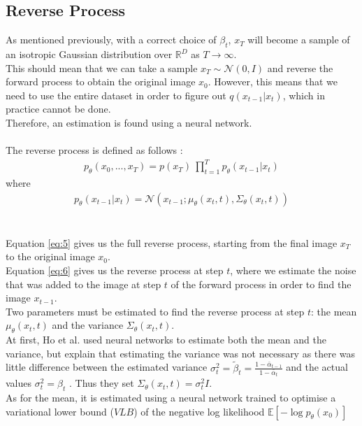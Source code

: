 \documentclass{article}
\begin{document}
\subsection{Reverse Process}

As mentioned previously, with a correct choice of $\beta_t$, $x_T$ will become a sample of an isotropic Gaussian distribution over $\mathbb{R}^D$ as $T \rightarrow \infty$. \cite{nichol2021improved, sohldickstein2015deep} \\
This should mean that we can take a sample $x_T \sim \mathcal{N}\left(0, I\right)$ and reverse the forward process to obtain the original image $x_0$. 
However, this means that we need to use the entire dataset in order to figure out $q\left(x_{t-1} | x_t\right)$, which in practice cannot be done. \cite{nichol2021improved} \\
Therefore, an estimation is found using a neural network. \cite{nichol2021improved}
\\\\
The reverse process is defined as follows \cite{ho2020denoising}:
\begin{gather}
  p_{\theta}\left(x_0, ..., x_T\right) = p\left(x_T\right) \: \prod_{t=1}^T p_{\theta}\left(x_{t-1} | x_t\right)
\end{gather}
where
\begin{gather}
  p_{\theta}\left(x_{t-1} | x_t\right) = \mathcal{N}\left(x_{t-1}; \mu_{\theta}\left(x_t, t\right), \Sigma_{\theta}\left(x_t, t\right)\right)
\end{gather}
\\\\
Equation \ref{eq:5} gives us the full reverse process, starting from the final image $x_T$ to the original image $x_0$. \\
Equation \ref{eq:6} gives us the reverse process at step $t$, where we estimate the noise that was added to the image at step $t$ of the forward process in order to find the image $x_{t-1}$. \\
Two parameters must be estimated to find the reverse process at step $t$: the mean $\mu_{\theta}\left(x_t, t\right)$ and the variance $\Sigma_{\theta}\left(x_t, t\right)$. \\
At first, Ho et al. \cite{ho2020denoising} used neural networks to estimate both the mean and the variance, but explain that estimating the variance was not necessary as there was little difference between the estimated variance $\sigma_t^2 = \tilde{\beta}_t = \frac{1 - \bar{\alpha}_{t-1}}{1 - \bar{\alpha}_t}$ and the actual values $\sigma_t^2 = \beta_t$ \cite{ho2020denoising}. Thus they set $\Sigma_{\theta}\left(x_t, t\right) = \sigma_t^2 I$. \\
As for the mean, it is estimated using a neural network trained to optimise a variational lower bound ($VLB$) of the negative log likelihood $\mathbb{E}\left[- \log p_{\theta} \left(x_0\right)\right]$ \cite{ho2020denoising}
\end{document}
